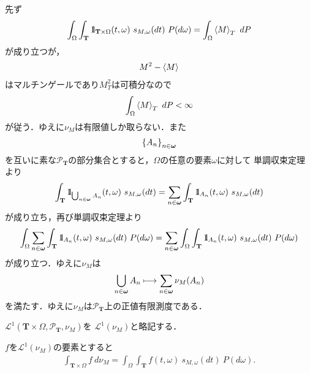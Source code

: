 	\begin{sketch}
		先ず
		\begin{align}
			\int_\Omega \int_{\mathbf{T}} \defunc_{\mathbf{T} \times \Omega}(t,\omega)\ s_{M,\omega}(dt)\ P(d\omega)
			= \int_\Omega \inprod<M>_T\ dP
		\end{align}
		が成り立つが，
		\begin{align}
			M^2 - \inprod<M>
		\end{align}
		はマルチンゲールであり$M_T^2$は可積分なので
		\begin{align}
			\int_\Omega \inprod<M>_T\ dP < \infty
		\end{align}
		が従う．ゆえに$\nu_M$は有限値しか取らない．また
		\begin{align}
			\left\{A_n\right\}_{n \in {\boldsymbol \omega}}
		\end{align}
		を互いに素な$\mathscr{P}_{\mathbf{T}}$の部分集合とすると，$\Omega$の任意の要素$\omega$に対して
		単調収束定理より
		\begin{align}
			\int_{\mathbf{T}} \mbox{1}\hspace{-0.25em}\mbox{l}_{\bigcup_{n \in {\boldsymbol \omega}}A_n}(t,\omega)\ s_{M,\omega}(dt)
			= \sum_{n \in {\boldsymbol \omega}} \int_{\mathbf{T}} \mbox{1}\hspace{-0.25em}\mbox{l}_{A_n}(t,\omega)\ s_{M,\omega}(dt)
		\end{align}
		が成り立ち，再び単調収束定理より
		\begin{align}
			\int_\Omega \sum_{n \in {\boldsymbol \omega}} \int_{\mathbf{T}} \mbox{1}\hspace{-0.25em}\mbox{l}_{A_n}(t,\omega)\ s_{M,\omega}(dt)\ P(d\omega)
			= \sum_{n \in {\boldsymbol \omega}} \int_\Omega \int_{\mathbf{T}} \mbox{1}\hspace{-0.25em}\mbox{l}_{A_n}(t,\omega)\ s_{M,\omega}(dt)\ P(d\omega)
		\end{align}
		が成り立つ．ゆえに$\nu_M$は
		\begin{align}
			\bigcup_{n \in {\boldsymbol \omega}} A_n \longmapsto \sum_{n \in {\boldsymbol \omega}} \nu_M(A_n)
		\end{align}
		を満たす．ゆえに$\nu_M$は$\mathscr{P}_{\mathbf{T}}$上の正値有限測度である．
		\QED
	\end{sketch}
	
	$\mathscr{L}^1(\mathbf{T} \times \Omega,\mathscr{P}_{\mathbf{T}},\nu_M)$を
	$\mathscr{L}^1(\nu_M)$と略記する．
	
	\begin{screen}
		\begin{thm}[可積分可予測過程の積分表現]
			$f$を$\mathscr{L}^1(\nu_M)$の要素とすると
			\begin{align}
				\int_{\mathbf{T} \times \Omega} f\ d\nu_M 
				= \int_\Omega \int_{\mathbf{T}} f(t,\omega)\ s_{M,\omega}(dt)\ P(d\omega).
			\end{align}
		\end{thm}
	\end{screen}
	
